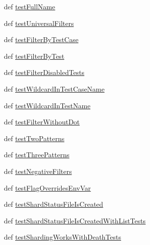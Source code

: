 \begin{DoxyCompactItemize}
\item 
def \hyperlink{classgtest__filter__unittest_1_1GTestFilterUnitTest_a7558aed26a1dd69723409bc062a10640}{test\-Full\-Name}
\item 
def \hyperlink{classgtest__filter__unittest_1_1GTestFilterUnitTest_abb3f1672b52d8e948f844490370a1784}{test\-Universal\-Filters}
\item 
def \hyperlink{classgtest__filter__unittest_1_1GTestFilterUnitTest_aafa4bcaa6c548bcd013f1b48fb218fd5}{test\-Filter\-By\-Test\-Case}
\item 
def \hyperlink{classgtest__filter__unittest_1_1GTestFilterUnitTest_a170b8efccaa005be648a552aad155c4f}{test\-Filter\-By\-Test}
\item 
def \hyperlink{classgtest__filter__unittest_1_1GTestFilterUnitTest_a4ea8177f70a866f265f1928dc56d6804}{test\-Filter\-Disabled\-Tests}
\item 
def \hyperlink{classgtest__filter__unittest_1_1GTestFilterUnitTest_abf623deb2f06b59539e27cfb835e268a}{test\-Wildcard\-In\-Test\-Case\-Name}
\item 
def \hyperlink{classgtest__filter__unittest_1_1GTestFilterUnitTest_a4af4acae2128bc1e38ad7cb9469b0a94}{test\-Wildcard\-In\-Test\-Name}
\item 
def \hyperlink{classgtest__filter__unittest_1_1GTestFilterUnitTest_a380b6c3d4392a85f2dba0bad735361b9}{test\-Filter\-Without\-Dot}
\item 
def \hyperlink{classgtest__filter__unittest_1_1GTestFilterUnitTest_a77b819fcfd18a250535be29b81ad1cea}{test\-Two\-Patterns}
\item 
def \hyperlink{classgtest__filter__unittest_1_1GTestFilterUnitTest_af3a9bd921a064ab4440ebe93b05b5ae8}{test\-Three\-Patterns}
\item 
def \hyperlink{classgtest__filter__unittest_1_1GTestFilterUnitTest_aadbaa7222398310d4f5106215780e698}{test\-Negative\-Filters}
\item 
def \hyperlink{classgtest__filter__unittest_1_1GTestFilterUnitTest_acfa6c563d6c35b14e6d2749a0da630f6}{test\-Flag\-Overrides\-Env\-Var}
\item 
def \hyperlink{classgtest__filter__unittest_1_1GTestFilterUnitTest_a84cc3ba566ebd3f7fa6280cca2250b26}{test\-Shard\-Status\-File\-Is\-Created}
\item 
def \hyperlink{classgtest__filter__unittest_1_1GTestFilterUnitTest_ac8d1717e463456a1d6349d8cad116e6d}{test\-Shard\-Status\-File\-Is\-Created\-With\-List\-Tests}
\item 
def \hyperlink{classgtest__filter__unittest_1_1GTestFilterUnitTest_a5347a028e4a78b700fd61e2eca6f4ce9}{test\-Sharding\-Works\-With\-Death\-Tests}
\end{DoxyCompactItemize}


